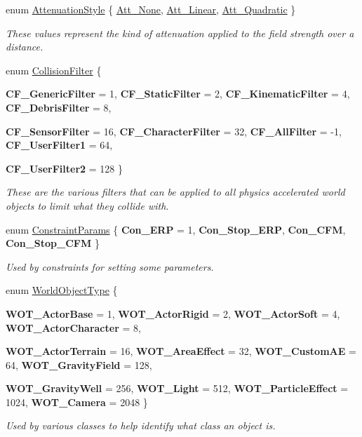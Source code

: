 \begin{DoxyCompactItemize}
enum \hyperlink{namespacephys_ad4ce7ee5c1cc164f2ea3d5f28211739f}{AttenuationStyle} \{ \hyperlink{namespacephys_ad4ce7ee5c1cc164f2ea3d5f28211739faec47e7157a10201b7aef0c1cbb6ccb5d}{Att\_\-None}, 
\hyperlink{namespacephys_ad4ce7ee5c1cc164f2ea3d5f28211739fabcceb16182220293f2260edb41b548f1}{Att\_\-Linear}, 
\hyperlink{namespacephys_ad4ce7ee5c1cc164f2ea3d5f28211739fac9ef08c39daa338975f4f8879e86100b}{Att\_\-Quadratic}
 \}
\begin{DoxyCompactList}\small\item\em These values represent the kind of attenuation applied to the field strength over a distance. \item\end{DoxyCompactList}\item 
enum \hyperlink{namespacephys_aa69523df12b54123e76c40734556ca35}{CollisionFilter} \{ \par
{\bfseries CF\_\-GenericFilter} =  1, 
{\bfseries CF\_\-StaticFilter} =  2, 
{\bfseries CF\_\-KinematicFilter} =  4, 
{\bfseries CF\_\-DebrisFilter} =  8, 
\par
{\bfseries CF\_\-SensorFilter} =  16, 
{\bfseries CF\_\-CharacterFilter} =  32, 
{\bfseries CF\_\-AllFilter} =  -\/1, 
{\bfseries CF\_\-UserFilter1} =  64, 
\par
{\bfseries CF\_\-UserFilter2} =  128
 \}
\begin{DoxyCompactList}\small\item\em These are the various filters that can be applied to all physics accelerated world objects to limit what they collide with. \item\end{DoxyCompactList}\item 
enum \hyperlink{namespacephys_a3d9969958345dec81ed83544445e3c28}{ConstraintParams} \{ {\bfseries Con\_\-ERP} =  1, 
{\bfseries Con\_\-Stop\_\-ERP}, 
{\bfseries Con\_\-CFM}, 
{\bfseries Con\_\-Stop\_\-CFM}
 \}
\begin{DoxyCompactList}\small\item\em Used by constraints for setting some parameters. \item\end{DoxyCompactList}\item 
enum \hyperlink{namespacephys_a56410935e1c614a932dbc91ee7330df1}{WorldObjectType} \{ \par
{\bfseries WOT\_\-ActorBase} =  1, 
{\bfseries WOT\_\-ActorRigid} =  2, 
{\bfseries WOT\_\-ActorSoft} =  4, 
{\bfseries WOT\_\-ActorCharacter} =  8, 
\par
{\bfseries WOT\_\-ActorTerrain} =  16, 
{\bfseries WOT\_\-AreaEffect} =  32, 
{\bfseries WOT\_\-CustomAE} =  64, 
{\bfseries WOT\_\-GravityField} =  128, 
\par
{\bfseries WOT\_\-GravityWell} =  256, 
{\bfseries WOT\_\-Light} =  512, 
{\bfseries WOT\_\-ParticleEffect} =  1024, 
{\bfseries WOT\_\-Camera} =  2048
 \}
\begin{DoxyCompactList}\small\item\em Used by various classes to help identify what class an object is. \item\end{DoxyCompactList}\end{DoxyCompactItemize}
